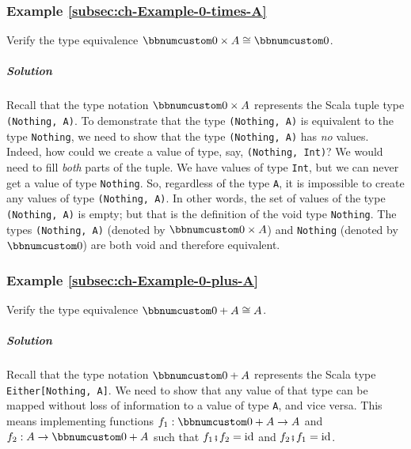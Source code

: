 \subsubsection{Example \label{subsec:ch-Example-0-times-A}\ref{subsec:ch-Example-0-times-A}}

Verify the type equivalence $\bbnum 0\times A\cong\bbnum 0$.

\subparagraph{Solution}

Recall that the type notation $\bbnum 0\times A$ represents the Scala
tuple type \lstinline!(Nothing, A)!. To demonstrate that the type
\lstinline!(Nothing, A)! is equivalent to the type \lstinline!Nothing!,
we need to show that the type \lstinline!(Nothing, A)! has \emph{no}
values. Indeed, how could we create a value of type, say, \lstinline!(Nothing, Int)!?
We would need to fill \emph{both} parts of the tuple. We have values
of type \lstinline!Int!, but we can never get a value of type \lstinline!Nothing!.
So, regardless of the type \lstinline!A!, it is impossible to create
any values of type \lstinline!(Nothing, A)!. In other words, the
set of values of the type \lstinline!(Nothing, A)! is empty; but
that is the definition of the void type \lstinline!Nothing!. The
types \lstinline!(Nothing, A)! (denoted by $\bbnum 0\times A$) and
\lstinline!Nothing! (denoted by $\bbnum 0$) are both void and therefore
equivalent.

\subsubsection{Example \label{subsec:ch-Example-0-plus-A}\ref{subsec:ch-Example-0-plus-A}}

Verify the type equivalence $\bbnum 0+A\cong A$.

\subparagraph{Solution}

Recall that the type notation $\bbnum 0+A$ represents the Scala type
\lstinline!Either[Nothing, A]!. We need to show that any value of
that type can be mapped without loss of information to a value of
type \lstinline!A!, and vice versa. This means implementing functions
$f_{1}:\bbnum 0+A\rightarrow A$ and $f_{2}:A\rightarrow\bbnum 0+A$
such that $f_{1}\bef f_{2}=\text{id}$ and $f_{2}\bef f_{1}=\text{id}$.

